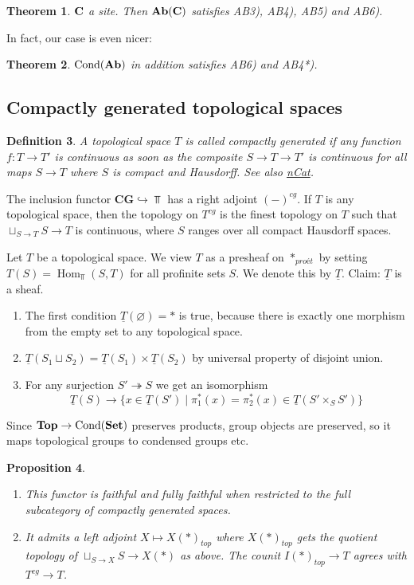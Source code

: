 \documentclass[A4paper, british, reqno]{amsart}
\theoremstyle{darkgreentheorem}
\newtheorem{thm}{Theorem}[section]
\newtheorem{prop}[thm]{Proposition}
\theoremstyle{darkbluedefinition}
\newtheorem{defn}[thm]{Definition}
\theoremstyle{darkredexample}
\theoremstyle{remark}
\DeclareMathOperator{\Hom}{Hom}
\DeclareMathOperator{\Cond}{Cond}
\newcommand{\CG}{\mathbf{CG}}
\newcommand{\1}{\mathbbm{1}}
\newcommand{\pe}{*_{proét}}
\renewcommand{\u}[1]{\underline{#1}}
\newcommand{\fp}[1]{\times_{#1}}
\begin{document}
\begin{thm}
    $\mathbf{C}$ a site. Then $\mathbf{Ab}(\mathbf{C})$ satisfies AB3), AB4), AB5) and AB6).
\end{thm}

In fact, our case is even nicer:

\begin{thm}
    $\Cond(\Ab)$ in addition satisfies AB6) and AB4*).
\end{thm}

\subsection{Compactly generated topological spaces}

\begin{defn}
    A topological space $T$ is called \textit{compactly generated} if any function $f\colon T\to T'$ is continuous as soon as the composite $S\to T\to T'$ is continuous for all maps $S\to T$ where $S$ is compact and Hausdorff.
    See also \href{https://ncatlab.org/nlab/show/compactly+generated+topological+space}{nCat}.
\end{defn}

The inclusion functor $\CG \hookrightarrow \Top$ has a right adjoint $(-)^{cg}$.
If $T$ is any topological space, then the topology on $T^{cg}$ is the finest topology on $T$ such that $\sqcup_{S\to T}S\to T$ is continuous, where $S$ ranges over all compact Hausdorff spaces.

Let $T$ be a topological space.
We view $T$ as a presheaf on $\pe$ by setting $T(S)=\Hom_{\Top}(S,T)$ for all profinite sets $S$.
We denote this by $\u{T}$.
Claim: $\u{T}$ is a sheaf.
\begin{enumerate}[label=\roman*)]
    \item The first condition $\u{T}(\varnothing)=*$ is true, because there is exactly one morphism from the empty set to any topological space.
    \item $\u{T}(S_{1}\sqcup S_{2})=\u{T}(S_{1})\times \u{T}(S_{2})$ by universal property of disjoint union.
    \item For any surjection $S'\twoheadrightarrow S$ we get an isomorphism
	\[ \u{T}(S)\to \{ x\in \u{T}(S')\mid \pi_{1}^{*}(x)=\pi_{2}^{*}(x)\in \u{T}(S'\fp{S}S')\}\]
\end{enumerate}

Since $\Top\to \Cond(\Set)$ preserves products, group objects are preserved, so it maps topological groups to condensed groups etc.

\begin{prop}
    \begin{enumerate}[label=\roman*)]
	\item This functor is faithful and fully faithful when restricted to the full subcategory of compactly generated spaces.
	\item It admits a left adjoint $X\mapsto X(*)_{top}$ where $X(*)_{top}$ gets the quotient topology of $\sqcup_{S\to X}S\to X(*)$ as above.
	    The counit $I(*)_{top}\to T$ agrees with $T^{cg}\to T$.
    \end{enumerate}
\end{prop}
\end{document}
